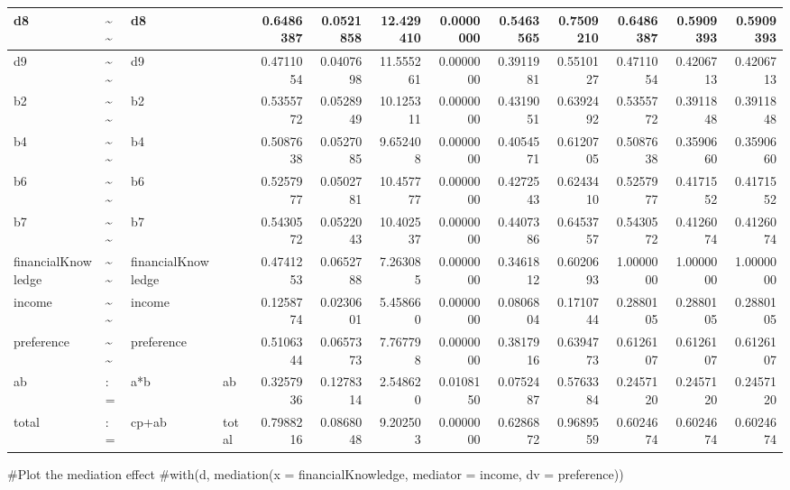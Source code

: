 \documentclass[
  super,
  preprint,
  3p]{elsarticle}
\newenvironment{Shaded}{\begin{snugshade}}{\end{snugshade}}
\newcommand{\CommentTok}[1]{\textcolor[rgb]{0.37,0.37,0.37}{#1}}
\begin{document}
\begin{tabular}{l|l|l|l|r|r|r|r|r|r|r|r|r}
\hline
d8 & \textasciitilde{}\textasciitilde{} & d8 &  & 0.6486387 & 0.0521858 & 12.429410 & 0.0000000 & 0.5463565 & 0.7509210 & 0.6486387 & 0.5909393 & 0.5909393\\
\hline
d9 & \textasciitilde{}\textasciitilde{} & d9 &  & 0.4711054 & 0.0407698 & 11.555261 & 0.0000000 & 0.3911981 & 0.5510127 & 0.4711054 & 0.4206713 & 0.4206713\\
\hline
b2 & \textasciitilde{}\textasciitilde{} & b2 &  & 0.5355772 & 0.0528949 & 10.125311 & 0.0000000 & 0.4319051 & 0.6392492 & 0.5355772 & 0.3911848 & 0.3911848\\
\hline
b4 & \textasciitilde{}\textasciitilde{} & b4 &  & 0.5087638 & 0.0527085 & 9.652408 & 0.0000000 & 0.4054571 & 0.6120705 & 0.5087638 & 0.3590660 & 0.3590660\\
\hline
b6 & \textasciitilde{}\textasciitilde{} & b6 &  & 0.5257977 & 0.0502781 & 10.457777 & 0.0000000 & 0.4272543 & 0.6243410 & 0.5257977 & 0.4171552 & 0.4171552\\
\hline
b7 & \textasciitilde{}\textasciitilde{} & b7 &  & 0.5430572 & 0.0522043 & 10.402537 & 0.0000000 & 0.4407386 & 0.6453757 & 0.5430572 & 0.4126074 & 0.4126074\\
\hline
financialKnowledge & \textasciitilde{}\textasciitilde{} & financialKnowledge &  & 0.4741253 & 0.0652788 & 7.263085 & 0.0000000 & 0.3461812 & 0.6020693 & 1.0000000 & 1.0000000 & 1.0000000\\
\hline
income & \textasciitilde{}\textasciitilde{} & income &  & 0.1258774 & 0.0230601 & 5.458660 & 0.0000000 & 0.0806804 & 0.1710744 & 0.2880105 & 0.2880105 & 0.2880105\\
\hline
preference & \textasciitilde{}\textasciitilde{} & preference &  & 0.5106344 & 0.0657373 & 7.767798 & 0.0000000 & 0.3817916 & 0.6394773 & 0.6126107 & 0.6126107 & 0.6126107\\
\hline
ab & := & a*b & ab & 0.3257936 & 0.1278314 & 2.548620 & 0.0108150 & 0.0752487 & 0.5763384 & 0.2457120 & 0.2457120 & 0.2457120\\
\hline
total & := & cp+ab & total & 0.7988216 & 0.0868048 & 9.202503 & 0.0000000 & 0.6286872 & 0.9689559 & 0.6024674 & 0.6024674 & 0.6024674\\
\hline
\end{tabular}

\begin{Shaded}
\begin{Highlighting}[]
\CommentTok{\#Plot the mediation effect}
\CommentTok{\#with(d, mediation(x = financialKnowledge, mediator = income, dv = preference))}
\end{Highlighting}
\end{Shaded}
\end{document}
